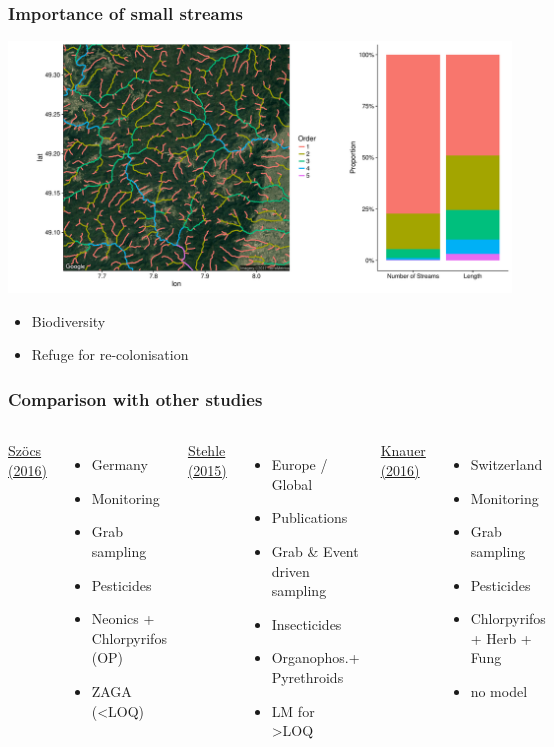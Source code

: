 \documentclass[
	10pt
	]{beamer}
\begin{document}
\begin{frame}
\frametitle{Importance of small streams}
	\includegraphics[width=\textwidth]{figs/streams_distr.pdf}
	\begin{itemize}
		\item Biodiversity
		\item Refuge for re-colonisation
	\end{itemize}
\end{frame}


\begin{frame}
\frametitle{Comparison with other studies}
	\begin{columns}[T]
	    \underline{Szöcs (2016)}
	    \begin{itemize}
        	\item Germany
        	\item Monitoring
        	\item Grab sampling \vspace{1.2em}
        	\item Pesticides
        	\item Neonics + Chlorpyrifos (OP)
        	\item ZAGA (\textless LOQ)
        \end{itemize}
	    \underline{Stehle (2015)}
	    \begin{itemize}
        	\item Europe / Global
        	\item Publications
        	\item Grab \& Event driven sampling
        	\item Insecticides
        	\item Organophos.+ Pyrethroids
        	\item LM for \textgreater LOQ
        \end{itemize}
	    \underline{Knauer (2016)}
	    \begin{itemize}
        	\item Switzerland
        	\item Monitoring
        	\item Grab sampling \vspace{1.2em}
        	\item Pesticides
        	\item Chlorpyrifos + Herb + Fung
        	\item no model
        \end{itemize}
	\end{columns}
\end{frame}
\end{document}
